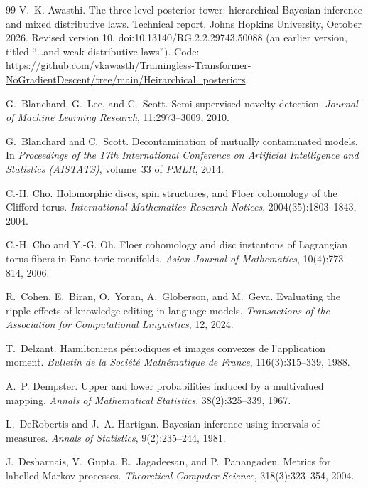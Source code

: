 \documentclass[11pt]{article}
\theoremstyle{definition}
\theoremstyle{remark}
\begin{document}
\begin{thebibliography}{99}
V.~K. Awasthi.
\newblock The three-level posterior tower: hierarchical Bayesian inference and mixed distributive laws.
\newblock Technical report, Johns Hopkins University, October 2026. Revised version 10.
\newblock doi:10.13140/RG.2.2.29743.50088 (an earlier version, titled ``\ldots and weak distributive laws''). Code: \url{https://github.com/vkawasth/Trainingless-Transformer-NoGradientDescent/tree/main/Heirarchical_posteriors}.

G.~Blanchard, G.~Lee, and C.~Scott.
\newblock Semi-supervised novelty detection.
\newblock \emph{Journal of Machine Learning Research}, 11:2973--3009, 2010.

G.~Blanchard and C.~Scott.
\newblock Decontamination of mutually contaminated models.
\newblock In \emph{Proceedings of the 17th International Conference on Artificial Intelligence and
  Statistics (AISTATS)}, volume~33 of \emph{PMLR}, 2014.

C.-H. Cho.
\newblock Holomorphic discs, spin structures, and {F}loer cohomology of the {C}lifford torus.
\newblock \emph{International Mathematics Research Notices}, 2004(35):1803--1843, 2004.

C.-H. Cho and Y.-G. Oh.
\newblock Floer cohomology and disc instantons of {L}agrangian torus fibers in {F}ano toric manifolds.
\newblock \emph{Asian Journal of Mathematics}, 10(4):773--814, 2006.

R.~Cohen, E.~Biran, O.~Yoran, A.~Globerson, and M.~Geva.
\newblock Evaluating the ripple effects of knowledge editing in language models.
\newblock \emph{Transactions of the Association for Computational Linguistics}, 12, 2024.

T.~Delzant.
\newblock Hamiltoniens p\'eriodiques et images convexes de l'application moment.
\newblock \emph{Bulletin de la Soci\'et\'e Math\'ematique de France}, 116(3):315--339, 1988.

A.~P. Dempster.
\newblock Upper and lower probabilities induced by a multivalued mapping.
\newblock \emph{Annals of Mathematical Statistics}, 38(2):325--339, 1967.

L.~DeRobertis and J.~A. Hartigan.
\newblock Bayesian inference using intervals of measures.
\newblock \emph{Annals of Statistics}, 9(2):235--244, 1981.

J.~Desharnais, V.~Gupta, R.~Jagadeesan, and P.~Panangaden.
\newblock Metrics for labelled {M}arkov processes.
\newblock \emph{Theoretical Computer Science}, 318(3):323--354, 2004.


\end{thebibliography}
\end{document}
